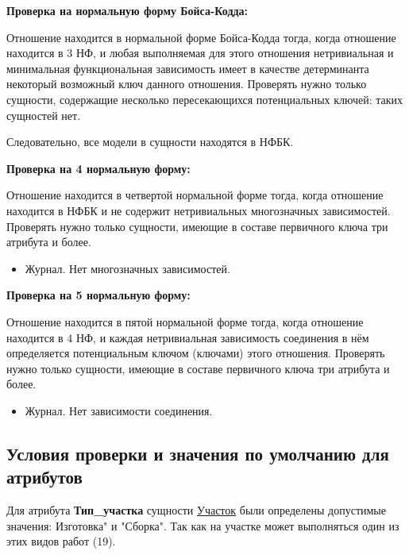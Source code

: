 {\bf Проверка на нормальную форму Бойса-Кодда:}

Отношение находится в нормальной форме Бойса-Кодда тогда, когда отношение находится в 3 НФ, и любая выполняемая для этого отношения нетривиальная и минимальная функциональная зависимость имеет в качестве детерминанта некоторый возможный ключ данного отношения.
Проверять нужно только сущности, содержащие несколько пересекающихся потенциальных ключей: таких сущностей нет.

Следовательно, все модели в сущности находятся в НФБК.

{\bf Проверка на 4 нормальную форму:}

Отношение находится в четвертой нормальной форме тогда, когда отношение находится в НФБК и не содержит нетривиальных многозначных зависимостей.
Проверять нужно только сущности, имеющие в составе первичного ключа три атрибута и более.

\begin{itemize}

    \item Журнал. Нет многозначных зависимостей.

\end{itemize}



{\bf Проверка на 5 нормальную форму:}

Отношение находится в пятой нормальной форме тогда, когда отношение находится в 4 НФ, и каждая нетривиальная зависимость соединения в нём определяется потенциальным ключом (ключами) этого отношения.
Проверять нужно только сущности, имеющие в составе первичного ключа три атрибута и более.

\begin{itemize}

    \item Журнал. Нет зависимости соединения.

\end{itemize}

\subsection{Условия проверки и значения по умолчанию для атрибутов}

Для атрибута {\bf Тип\_участка} сущности \underline{Участок} были определены допустимые значения: Изготовка" и "Сборка".
Так как на участке может выполняться один из этих видов работ (19).

